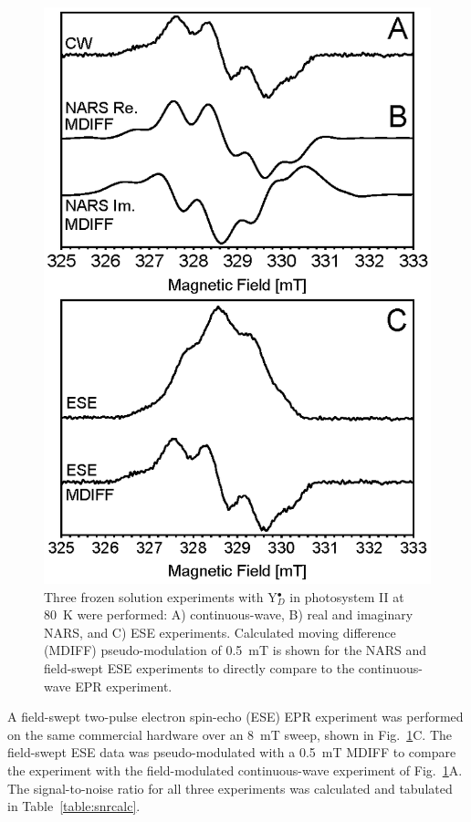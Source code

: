 \begin{figure}[htb]
\centering
\includegraphics{Kapitel/Ch4-Images/02-PSII-BBY-Data.eps}
\caption[Frozen solution EPR on an 85~nl volume sample at X-band.]{Three frozen solution experiments with Y$_D^\bullet$ in photosystem II at 80~K were performed: A) continuous-wave, B) real and imaginary NARS, and C) ESE experiments. Calculated moving difference (MDIFF) pseudo-modulation of 0.5~mT is shown for the NARS and field-swept ESE experiments to directly compare to the continuous-wave EPR experiment.}
\label{fig:BBYPSII}
\end{figure}

A field-swept two-pulse electron spin-echo (ESE) EPR experiment was performed on the same commercial hardware over an 8~mT sweep, shown in Fig.~\ref{fig:BBYPSII}C. The field-swept ESE data was pseudo-modulated with a 0.5~mT MDIFF to compare the experiment with the field-modulated continuous-wave experiment of Fig.~\ref{fig:BBYPSII}A. The signal-to-noise ratio for all three experiments was calculated and tabulated in Table~\ref{table:snrcalc}. 

